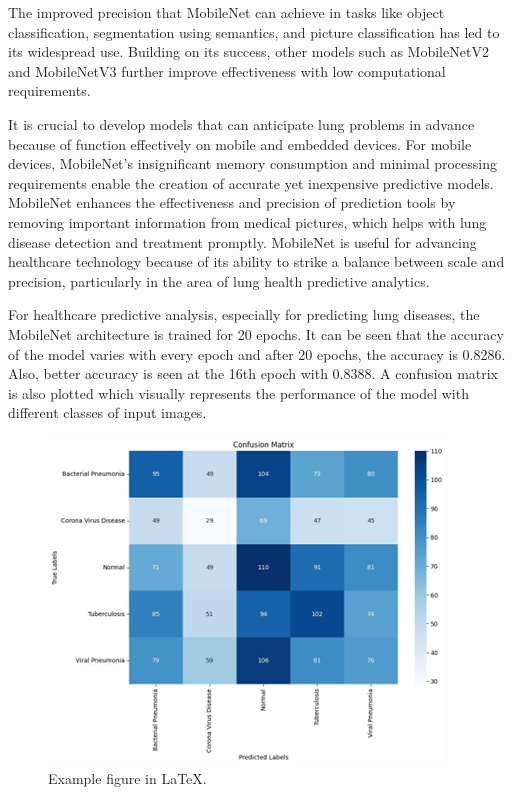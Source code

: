 The improved precision that MobileNet can achieve in tasks like object classification, segmentation using semantics, and picture classification has led to its widespread use. Building on its success, other models such as MobileNetV2 and MobileNetV3 further improve effectiveness with low computational requirements. 

It is crucial to develop models that can anticipate lung problems in advance because of function effectively on mobile and embedded devices. For mobile devices, MobileNet's insignificant memory consumption and minimal processing requirements enable the creation of accurate yet inexpensive predictive models. MobileNet enhances the effectiveness and precision of prediction tools by removing important information from medical pictures, which helps with lung disease detection and treatment promptly. MobileNet is useful for advancing healthcare technology because of its ability to strike a balance between scale and precision, particularly in the area of lung health predictive analytics.

For healthcare predictive analysis, especially for predicting lung diseases, the MobileNet architecture is trained for 20 epochs. It can be seen that the accuracy of the model varies with every epoch and after 20  epochs, the accuracy is 0.8286. Also, better accuracy is seen at the 16th epoch with 0.8388. A confusion matrix is also plotted which visually represents the performance of the model with different classes of input images.
\begin{figure}[ht]
    \centering
    \includegraphics[scale=0.8]{figures/Picture3.png}
    \caption{Example figure in \LaTeX.}
    \label{fig:chart_a}
\end{figure}
